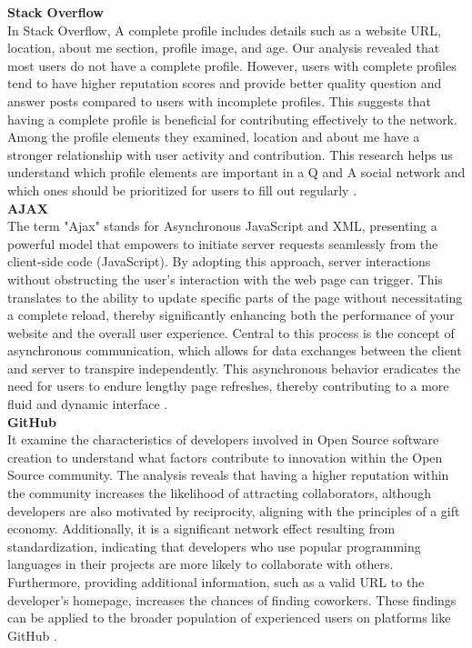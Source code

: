 \textbf{Stack Overflow}\\
In Stack Overflow, A complete profile includes details such as a website URL, location, about me section, profile image, and age. Our analysis revealed that most users do not have a complete profile. However, users with complete profiles tend to have higher reputation scores and provide better quality question and answer posts compared to users with incomplete profiles. This suggests that having a complete profile is beneficial for contributing effectively to the network. Among the profile elements they examined, location and about me have a stronger relationship with user activity and contribution. This research helps us understand which profile elements are important in a Q and A social network and which ones should be prioritized for users to fill out regularly \cite{adaji2016towards}.\\
\textbf{AJAX}\\
The term "Ajax" stands for Asynchronous JavaScript and XML, presenting a powerful model that empowers to initiate server requests seamlessly from the client-side code (JavaScript). By adopting this approach, server interactions without obstructing the user's interaction with the web page can trigger. This translates to the ability to update specific parts of the page without necessitating a complete reload, thereby significantly enhancing both the performance of your website and the overall user experience. Central to this process is the concept of asynchronous communication, which allows for data exchanges between the client and server to transpire independently. This asynchronous behavior eradicates the need for users to endure lengthy page refreshes, thereby contributing to a more fluid and dynamic interface \cite{paz2013ajax}.\\
\textbf{GitHub}\\
It examine the characteristics of developers involved in Open Source software creation to understand what factors contribute to innovation within the Open Source community. The analysis reveals that having a higher reputation within the community increases the likelihood of attracting collaborators, although developers are also motivated by reciprocity, aligning with the principles of a gift economy. Additionally, it is a significant network effect resulting from standardization, indicating that developers who use popular programming languages in their projects are more likely to collaborate with others. Furthermore, providing additional information, such as a valid URL to the developer's homepage, increases the chances of finding coworkers. These findings can be applied to the broader population of experienced users on platforms like GitHub \cite{celinska2018coding}.\\
